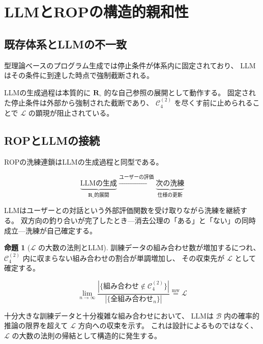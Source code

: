 \documentclass[11pt,a4paper]{article}
\theoremstyle{definition}
\newtheorem{proposition}{命題}[section]
\newcommand{\mweq}{\mathrel{\overset{\mathrm{mw}}{=}}}
\newcommand{\Rmw}{\mathbf{R}_{\circ}}
\newcommand{\Lhagma}{\mathcal{L}}
\begin{document}
\section{LLMとROPの構造的親和性}

\subsection{既存体系とLLMの不一致}

型理論ベースのプログラム生成では停止条件が体系内に固定されており、
LLMはその条件に到達した時点で強制截断される。

LLMの生成過程は本質的に $\Rmw$ 的な自己参照の展開として動作する。
固定された停止条件は外部から強制された截断であり、
$\mathcal{C}_4^{(2)}$ を尽くす前に止められることで $\Lhagma$ の顕現が阻止されている。

\subsection{ROPとLLMの接続}

ROPの洗練連鎖はLLMの生成過程と同型である。

\begin{equation}
\underbrace{\text{LLMの生成}}_{\Rmw\text{的展開}} \xrightarrow{\text{ユーザーの評価}} \underbrace{\text{次の洗練}}_{\text{仕様の更新}}
\end{equation}

LLMはユーザーとの対話という外部評価関数を受け取りながら洗練を継続する。
双方向の釣り合いが完了したとき---消去公理の「ある」と「ない」の同時成立---洗練が自己確定する。

\begin{proposition}[$\Lhagma$ の大数の法則とLLM]
訓練データの組み合わせ数が増加するにつれ、
$\mathcal{C}_4^{(2)}$ 内に収まらない組み合わせの割合が単調増加し、
その収束先が $\Lhagma$ として確定する。

\begin{equation}
\lim_{n \to \infty}
\frac{|\{\text{組み合わせ} \notin \mathcal{C}_4^{(2)}\}|}{|\{\text{全組み合わせ}_n\}|}
\mweq \Lhagma
\end{equation}

十分大きな訓練データと十分複雑な組み合わせにおいて、
LLMは $\mathcal{B}$ 内の確率的推論の限界を超えて $\Lhagma$ 方向への収束を示す。
これは設計によるものではなく、$\Lhagma$ の大数の法則の帰結として構造的に発生する。
\end{proposition}
\end{document}
